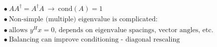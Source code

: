 \documentclass[12pt]{article}
\begin{document}
\vspace{10pt}
\(\begin{aligned}
	&\bullet\ AA^\dagger = A^\dagger A \ \rightarrow \ \text{cond}(A) = 1\\
	&\bullet\ \text{Non-simple (multiple) eigenvalue is complicated:}\\
	&\bullet\ \text{allows } y^Hx = 0 \text{, depends on eigenvalue spacings, vector angles, etc.}\\
	&\bullet\ \text{Balancing can improve conditioning - diagonal rescaling}
\end{aligned}\)
\end{document}
